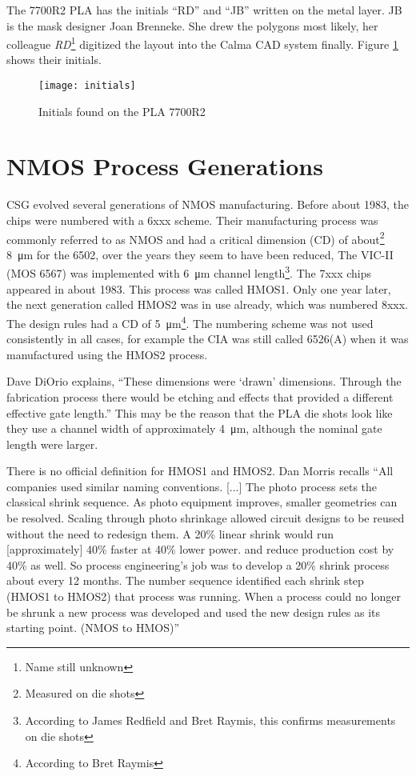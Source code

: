 The 7700R2 PLA has the initials ``RD'' and ``JB'' written on the metal
layer. JB is the mask designer Joan Brenneke. She drew the polygons most
likely, her colleague \textit{RD}\footnote {Name still unknown} digitized
the layout into the Calma CAD system finally. Figure \ref {fig:mos-initials}
shows their initials.

\begin{figure}
    \centering
    \texttt{[image: initials]}
    \caption{Initials found on the PLA 7700R2}
    \label{fig:mos-initials}
\end{figure}

\section{NMOS Process Generations}

CSG evolved several generations of NMOS manufacturing. Before about 1983,
the chips were numbered with a 6xxx scheme. Their manufacturing process was
commonly referred to as NMOS and had a critical dimension (CD)          of
about\footnote{Measured on die shots} \SI{8}{\micro\meter} for the 6502,
over the years they seem to have been reduced, The VIC-II (MOS 6567) was
implemented with \SI{6}{\micro\meter} channel length\footnote{According
to James Redfield and Bret Raymis, this confirms measurements on die shots}.
The 7xxx chips appeared in about 1983. This process was called HMOS1. Only
one year later, the next generation called HMOS2 was in use already, which
was numbered 8xxx. The design rules had a CD                             of
\SI{5}{\micro\meter}\footnote{According to Bret Raymis}. The numbering
scheme was not used consistently in all cases, for example the CIA was still
called 6526(A) when it was manufactured using the HMOS2 process.

Dave DiOrio explains, ``These dimensions were `drawn' dimensions. Through
the fabrication process there would be etching and effects that provided a
different effective gate length.'' This may be the reason that the PLA die
shots look like they use a channel width of approximately \SI {4}{
\micro\meter}, although the nominal gate length were larger.

There is no official definition for HMOS1 and HMOS2. Dan Morris recalls
``All companies used similar naming conventions. [...] The photo process
sets the classical shrink sequence. As photo equipment improves, smaller
geometries can be resolved. Scaling through photo shrinkage allowed circuit
designs to be reused without the need to redesign them. A 20\% linear shrink
would run [approximately] 40\% faster at 40\% lower power. and reduce
production cost by 40\% as well. So process engineering's job was to develop
a 20\% shrink process about every 12 months. The number sequence identified
each shrink step (HMOS1 to HMOS2) that process was running. When a process
could no longer be shrunk a new process was developed and used the new
design rules as its starting point. (NMOS to HMOS)''

